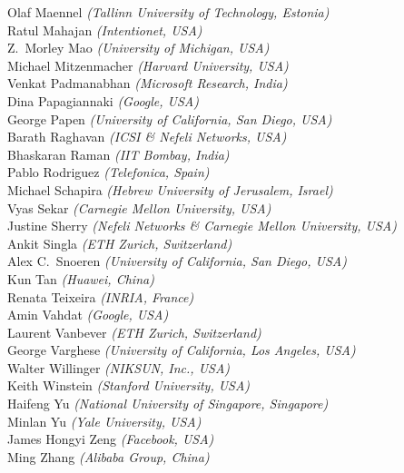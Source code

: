 \documentclass[sigconf]{acmart}
\begin{document}
\begin{minipage}[t]{.9\textwidth}
Olaf	Maennel {\it (Tallinn University of Technology, Estonia)}\\
Ratul Mahajan {\it (Intentionet, USA)}\\
Z.~Morley	Mao {\it (University of Michigan, USA)}\\
Michael Mitzenmacher {\it (Harvard University, USA)}\\
Venkat Padmanabhan {\it (Microsoft Research, India)}\\
Dina	Papagiannaki {\it (Google, USA)}\\
George Papen {\it (University of California, San Diego, USA)}\\
Barath Raghavan {\it (ICSI \& Nefeli Networks, USA)}\\
Bhaskaran Raman {\it (IIT Bombay, India)}\\
Pablo Rodriguez {\it (Telefonica, Spain)}\\
Michael Schapira {\it (Hebrew University of Jerusalem, Israel)}\\
Vyas	Sekar {\it (Carnegie Mellon University, USA)}\\
Justine Sherry {\it (Nefeli Networks \& Carnegie Mellon University, USA)}\\
Ankit Singla {\it (ETH Zurich, Switzerland)}\\
Alex	C.~Snoeren {\it (University of California, San Diego, USA)}\\
Kun Tan {\it (Huawei, China)}\\
Renata Teixeira {\it (INRIA, France)}\\
Amin Vahdat {\it (Google, USA)}\\
Laurent Vanbever {\it (ETH Zurich, Switzerland)}\\
George Varghese {\it (University of California, Los Angeles, USA)}\\
Walter Willinger {\it (NIKSUN, Inc., USA)}\\
Keith Winstein {\it (Stanford University, USA)}\\
Haifeng Yu {\it (National University of Singapore, Singapore)}\\
Minlan Yu {\it (Yale University, USA)}\\
James Hongyi Zeng	{\it (Facebook, USA)}\\
Ming	 Zhang {\it (Alibaba Group, China)}
\end{minipage}
\end{document}

